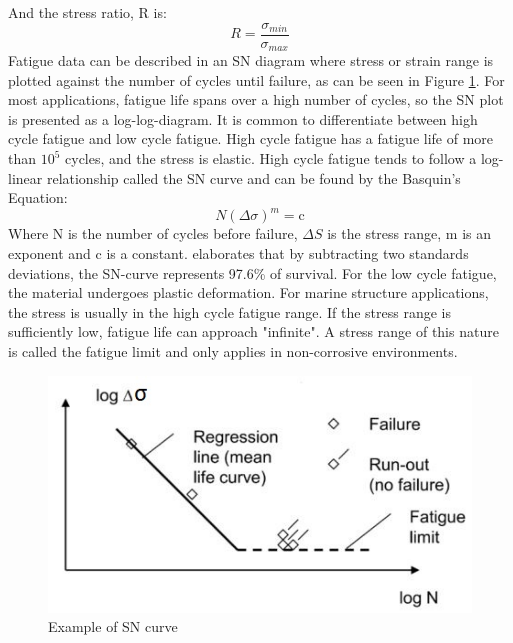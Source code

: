 \noindent And the stress ratio, R is:
\begin{equation}
    R=\frac{\sigma_{min}}{\sigma_{max}}
\end{equation}
Fatigue data can be described in an SN diagram where stress or strain range is plotted against the number of cycles until failure, as can be seen in Figure \ref{fig:sn}. For most applications, fatigue life spans over a high number of cycles, so the SN plot is presented as a log-log-diagram. It is common to differentiate between high cycle fatigue and low cycle fatigue. High cycle fatigue has a fatigue life of more than $10^5$ cycles, and the stress is elastic. High cycle fatigue tends to follow a log-linear relationship called the SN curve and can be found by the Basquin’s Equation:
\begin{equation}
    N(\Delta \sigma)^m = \text{c}
\end{equation}
\label{eq:sn}
\noindernt Where N is the number of cycles before failure, $\Delta S$ is the stress range, m is an exponent and c is a constant. \cite{dnvfatigue} elaborates that by subtracting two standards deviations, the SN-curve represents 97.6\% of survival. \newline
\newline
For the low cycle fatigue, the material undergoes plastic deformation. For marine structure applications, the stress is usually in the high cycle fatigue range. If the stress range is sufficiently low, fatigue life can approach "infinite". A stress range of this nature is called the fatigue limit and only applies in non-corrosive environments. 

\begin{figure}[h!]
\centering
\includegraphics[scale=1]{figures/sn}
\caption[$\; \:$Example of SN curve]{Example of SN curve  \cite{fatigue2016} }
 \label{fig:sn}
\end{figure}

